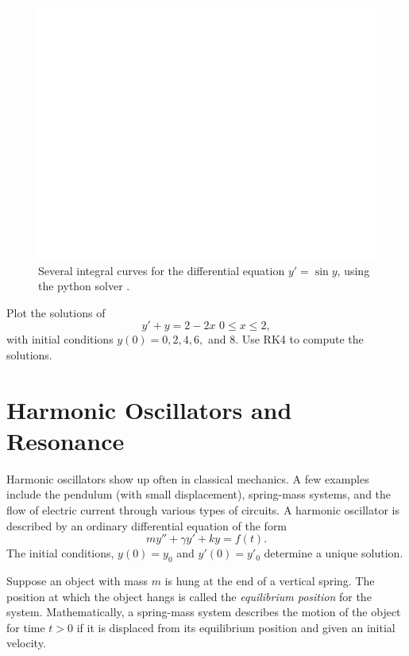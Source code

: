 \begin{figure}
\centering
\includegraphics[width=\textwidth]{Fig4.pdf}
\caption{Several integral curves for the differential equation $y' =\sin y$, using the python solver . }
\label{ivp:int_curves}
\end{figure}

\begin{problem}
Plot the solutions of 
\[ y' + y = 2-2x\,\, 0 \leq x \leq 2, \] 
with initial conditions $y(0) = 0, 2, 4, 6, $ and $8$. Use RK4 to compute the solutions. 
\end{problem}

\pagebreak
\section{Harmonic Oscillators and Resonance}

Harmonic oscillators show up often in classical mechanics. A few examples include the pendulum (with small displacement), spring-mass systems, and the flow of electric current through various types of circuits. 
A harmonic oscillator is described by an ordinary differential equation of the form \[my'' + \gamma y' + ky = f(t) .\] The initial conditions, $y(0) = y_0$ and $y'(0) = y'_0$ determine a unique solution. 

Suppose an object with mass $m$ is hung at the end of a vertical spring. The position at which the object hangs is called the \textit{equilibrium position} for the system. Mathematically, a spring-mass system describes the motion of the object for time $t > 0$  if it is displaced from its equilibrium position and given an initial velocity. 

